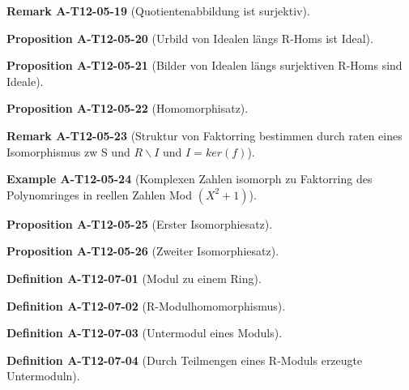 \documentclass[10pt, letterpaper]{article}
\newcommand{\CustomHeading}[3]{%
  \par\medskip\noindent%
  \textbf{#1 #2} \textnormal{(#3)}.\enskip%
}
\newenvironment{DEF}[2]{\CustomHeading{Definition}{#1}{#2}}{}
\newenvironment{PROP}[2]{\CustomHeading{Proposition}{#1}{#2}}{}
\newenvironment{REM}[2]{\CustomHeading{Remark}{#1}{#2}}{}
\newenvironment{EXA}[2]{\CustomHeading{Example}{#1}{#2}}{}
\begin{document}
\begin{REM}{A-T12-05-19}{Quotientenabbildung ist surjektiv}
\end{REM}

\begin{PROP}{A-T12-05-20}{Urbild von Idealen längs R-Homs ist Ideal}
\end{PROP}

\begin{PROP}{A-T12-05-21}{Bilder von Idealen längs surjektiven R-Homs sind Ideale}
\end{PROP}

\begin{PROP}{A-T12-05-22}{Homomorphisatz}
\end{PROP}

\begin{REM}{A-T12-05-23}{Struktur von Faktorring bestimmen durch raten eines Isomorphismus zw S und $R\backslash I$ und $I=ker(f)$}
\end{REM}

\begin{EXA}{A-T12-05-24}{Komplexen Zahlen isomorph zu Faktorring des Polynomringes in reellen Zahlen Mod $(X^2+1)$}
\end{EXA}

\begin{PROP}{A-T12-05-25}{Erster Isomorphiesatz}
\end{PROP}

\begin{PROP}{A-T12-05-26}{Zweiter Isomorphiesatz}
\end{PROP}

\begin{DEF}{A-T12-07-01}{Modul zu einem Ring}
\end{DEF}

\begin{DEF}{A-T12-07-02}{R-Modulhomomorphismus}
\end{DEF}

\begin{DEF}{A-T12-07-03}{Untermodul eines Moduls}
\end{DEF}

\begin{DEF}{A-T12-07-04}{Durch Teilmengen eines R-Moduls erzeugte Untermoduln}
\end{DEF}
\end{document}
